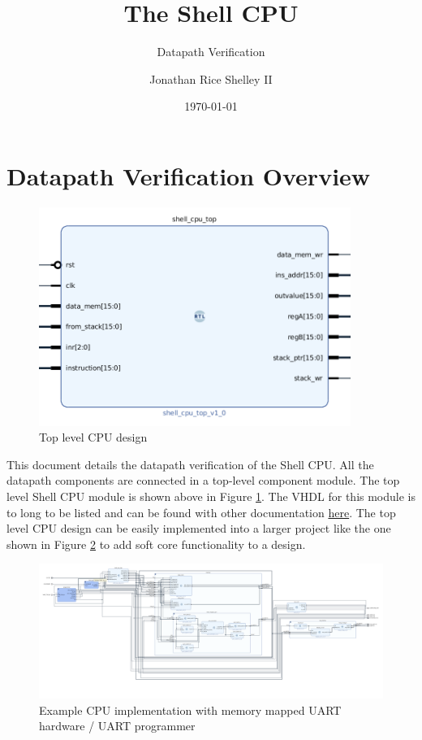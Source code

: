 \documentclass{article}
\subtitle{Datapath Verification}
\title{The Shell CPU}
\author{Jonathan Rice Shelley II}
\date{\today}
\begin{document}
\maketitle

\tableofcontents

\newpage

\section{Datapath Verification Overview }
\label{overview}
\begin{par}
	
	\begin{figure}[H]
		\centering
		\includegraphics[width=4in]{img/shell_cpu_top.png}
		\caption{Top level CPU design}
		\label{fig:tlcpud}
	\end{figure}
	
	This document details the datapath verification of the Shell CPU. All the datapath components are connected in a top-level component module. The top level Shell CPU module is shown above in Figure \ref{fig:tlcpud}. The VHDL for this module is to long to be listed and can be found with other documentation \href{https://github.com/RiceShelley/ShellCPU}{here}. The top level CPU design can be easily implemented into a larger project like the one shown in Figure \ref{fig:exdesign} to add soft core functionality to a design. 
	
	\begin{figure}[H]
		\centering
		\includegraphics[width=7in]{img/exDesign.png}
		\caption{Example CPU implementation with memory mapped UART hardware / UART programmer}
		\label{fig:exdesign}
	\end{figure}

\end{par}
\end{document}
